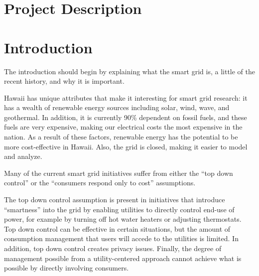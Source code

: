 
\renewcommand{\thepage} {C--\arabic{page}}

\renewcommand{\thesection} {C.\arabic{section}}
\setcounter{section}{0}

\section{Project Description}

\section{Introduction}

The introduction should begin by explaining what the smart grid is, a little of the
recent history, and why it is important. 

Hawaii has unique attributes that make it interesting for smart grid
research: it has a wealth of renewable energy sources including solar,
wind, wave, and geothermal.  In addition, it is currently 90\% dependent on
fossil fuels, and these fuels are very expensive, making our electrical
costs the most expensive in the nation.  As a result of these factors,
renewable energy has the potential to be more cost-effective in Hawaii.
Also, the grid is closed, making it easier to model and analyze.


Many of the current smart grid initiatives suffer from either the ``top
down control'' or the ``consumers respond only to cost'' assumptions. 

The top down control assumption is present in initiatives that introduce
``smartness'' into the grid by enabling utilities to directly control
end-use of power, for example by turning off hot water heaters or adjusting
thermostats.   Top down control can be effective in certain situations, but
the amount of consumption management that users will accede to the
utilities is limited.  In addition, top down control creates privacy
issues.  Finally, the degree of management possible from a utility-centered
approach cannot achieve what is possible by directly involving consumers. 

